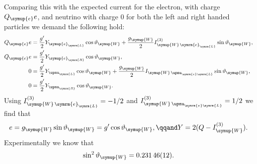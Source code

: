 \documentclass[fleqn]{NotesClass}
\newcommand{\Pparticle}[1]{\symup{#1}}
\newcommand{\Penominus}{\ensuremath{\Pparticle{e}}}
\newcommand{\PW}{\ensuremath{\Pparticle{W}}}
\newcommand{\Left}{\symrm{L}}
\newcommand{\Right}{\symrm{R}}
\begin{document}
    Comparing this with the expected current for the electron, with charge \(Q_{\Penominus}e\), and neutrino with charge \(0\) for both the left and right handed particles we demand the following hold:
    \begin{align}
        Q_{\Penominus}e &= \frac{g'}{2} Y_{\Penominus_{\Left}} \cos\vartheta_{\PW} + \frac{g_{\PW}}{2} I_{\PW \, \symrm{e}_{\Left}}^{(3)} \sin\vartheta_{\PW},\\
        Q_{\Penominus}e &= \frac{g'}{2} Y_{\Penominus_{\Right}} \cos\vartheta_{\PW},\\
        0 &= \frac{g'}{2} Y_{\upnu_{\Left}} \cos\vartheta_{\PW} + \frac{g_{\PW}}{2} I_{\PW \, \upnu_{\symrm{e}\Left}} \sin \vartheta_{\PW},\\
        0 &= \frac{g'}{2} Y_{\upnu_{\Right}} \cos\vartheta_{\PW}.
    \end{align}
    Using \(I_{\PW \, \symrm{e}_{\Left}}^{(3)} = -1/2\) and \(I_{\PW \, \upnu_{\symrm{e}\Left}}^{(3)} = 1/2\) we find that
    \begin{equation}
        e = g_{\PW} \sin\vartheta_{\PW} = g'\cos\vartheta_{\PW}, \qqand Y = 2(Q - I_{\PW}^{(3)}).
    \end{equation}
    Experimentally we know that
    \begin{equation}
        \sin^2 \vartheta_{\PW} = \num{0.23146(12)}.
    \end{equation}
    
\end{document}
